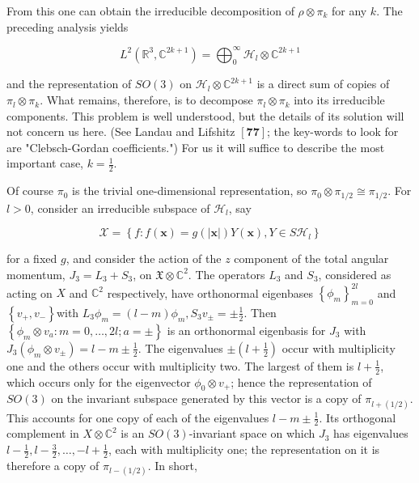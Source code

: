 \documentclass[10pt, letterpaper]{article}
\begin{document}
From this one can obtain the irreducible decomposition of $\rho \otimes \pi_{k}$ for any $k$. The preceding analysis yields

$$
L^{2}\left(\mathbb{R}^{3}, \mathbb{C}^{2 k+1}\right)=\bigoplus_{0}^{\infty} \mathcal{H}_{l} \otimes \mathbb{C}^{2 k+1}
$$

and the representation of $S O(3)$ on $\mathcal{H}_{l} \otimes \mathbb{C}^{2 k+1}$ is a direct sum of copies of $\pi_{l} \otimes \pi_{k}$. What remains, therefore, is to decompose $\pi_{l} \otimes \pi_{k}$ into its irreducible components. This problem is well understood, but the details of its solution will not concern us here. (See Landau and Lifshitz $[\mathbf{7 7}]$; the key-words to look for are "Clebsch-Gordan coefficients.") For us it will suffice to describe the most important case, $k=\frac{1}{2}$.

Of course $\pi_{0}$ is the trivial one-dimensional representation, so $\pi_{0} \otimes \pi_{1 / 2} \cong \pi_{1 / 2}$. For $l>0$, consider an irreducible subspace of $\mathcal{H}_{l}$, say

$$
\mathcal{X}=\left\{f: f(\mathbf{x})=g(|\mathbf{x}|) Y(\mathbf{x}), Y \in S \mathcal{H}_{l}\right\}
$$

for a fixed $g$, and consider the action of the $z$ component of the total angular momentum, $J_{3}=L_{3}+S_{3}$, on $\mathfrak{X} \otimes \mathbb{C}^{2}$. The operators $L_{3}$ and $S_{3}$, considered as acting on $X$ and $\mathbb{C}^{2}$ respectively, have orthonormal eigenbases $\left\{\phi_{m}\right\}_{m=0}^{2 l}$ and $\left\{v_{+}, v_{-}\right\}$with $L_{3} \phi_{m}=(l-m) \phi_{m}, S_{3} v_{ \pm}= \pm \frac{1}{2}$. Then $\left\{\phi_{m} \otimes v_{a}: m=0, \ldots, 2 l ; a= \pm\right\}$ is an orthonormal eigenbasis for $J_{3}$ with $J_{3}\left(\phi_{m} \otimes v_{ \pm}\right)=l-m \pm \frac{1}{2}$. The eigenvalues $\pm\left(l+\frac{1}{2}\right)$ occur with multiplicity one and the others occur with multiplicity two. The largest of them is $l+\frac{1}{2}$, which occurs only for the eigenvector $\phi_{0} \otimes v_{+}$; hence the representation of $S O(3)$ on the invariant subspace generated by this vector is a copy of $\pi_{l+(1 / 2)}$. This accounts for one copy of each of the eigenvalues $l-m \pm \frac{1}{2}$. Its orthogonal complement in $X \otimes \mathbb{C}^{2}$ is an $S O(3)$-invariant space on which $J_{3}$ has eigenvalues $l-\frac{1}{2}, l-\frac{3}{2}, \ldots,-l+\frac{1}{2}$, each with multiplicity one; the representation on it is therefore a copy of $\pi_{l-(1 / 2)}$. In short,
\end{document}
